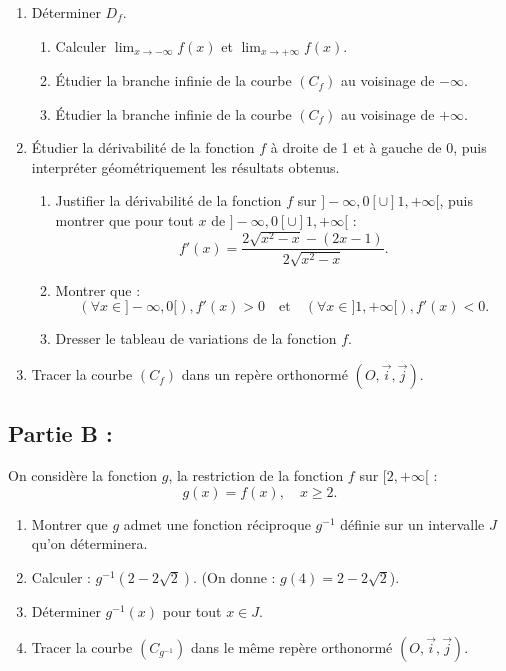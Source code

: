 \documentclass[12pt]{article}
\begin{document}
\begin{enumerate}
    \item Déterminer \( D_f \).
    \begin{enumerate}
        \item Calculer \( \lim_{x \to -\infty} f(x) \) et \( \lim_{x \to +\infty} f(x) \).
        \item Étudier la branche infinie de la courbe \( (C_f) \) au voisinage de \( -\infty \).
        \item Étudier la branche infinie de la courbe \( (C_f) \) au voisinage de \( +\infty \).
    \end{enumerate}

    \item Étudier la dérivabilité de la fonction \( f \) à droite de 1 et à gauche de 0, puis interpréter géométriquement les résultats obtenus.
    \begin{enumerate}
        \item Justifier la dérivabilité de la fonction \( f \) sur \( ]-\infty, 0[ \cup ]1, +\infty[ \), puis montrer que pour tout \( x \) de \( ]-\infty, 0[ \cup ]1, +\infty[ \) :
        \[
        f'(x) = \frac{2\sqrt{x^2 - x} - (2x - 1)}{2\sqrt{x^2 - x}}.
        \]
        \item Montrer que :
        \[
        (\forall x \in ]-\infty, 0[), f'(x) > 0 \quad \text{et} \quad (\forall x \in ]1, +\infty[), f'(x) < 0.
        \]
        \item Dresser le tableau de variations de la fonction \( f \).
    \end{enumerate}

    \item Tracer la courbe \( (C_f) \) dans un repère orthonormé \( (O, \vec{i}, \vec{j}) \).
\end{enumerate}
\subsection*{Partie B :}

On considère la fonction \( g \), la restriction de la fonction \( f \) sur \([2, +\infty[\) :
\[
g(x) = f(x), \quad x \geq 2.
\]

\begin{enumerate}
    \item Montrer que \( g \) admet une fonction réciproque \( g^{-1} \) définie sur un intervalle \( J \) qu'on déterminera.
    \item Calculer : \( g^{-1}(2 - 2\sqrt{2}) \). (On donne : \( g(4) = 2 - 2\sqrt{2} \)).
    \item Déterminer \( g^{-1}(x) \) pour tout \( x \in J \).
    \item Tracer la courbe \( (C_{g^{-1}}) \) dans le même repère orthonormé \( (O, \vec{i}, \vec{j}) \).
\end{enumerate}
\end{document}
